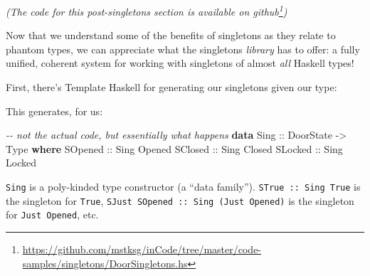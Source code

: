 \documentclass[]{article}
\newenvironment{Shaded}{}{}
\newcommand{\CommentTok}[1]{\textcolor[rgb]{0.38,0.63,0.69}{\textit{#1}}}
\newcommand{\DataTypeTok}[1]{\textcolor[rgb]{0.56,0.13,0.00}{#1}}
\newcommand{\KeywordTok}[1]{\textcolor[rgb]{0.00,0.44,0.13}{\textbf{#1}}}
\newcommand{\NormalTok}[1]{#1}
\newcommand{\OperatorTok}[1]{\textcolor[rgb]{0.40,0.40,0.40}{#1}}
\newcommand{\OtherTok}[1]{\textcolor[rgb]{0.00,0.44,0.13}{#1}}
\renewcommand{\href}[2]{#2\footnote{\url{#1}}}
\begin{document}
\emph{(The code for this post-singletons section is available
\href{https://github.com/mstksg/inCode/tree/master/code-samples/singletons/DoorSingletons.hs}{on
github})}

Now that we understand some of the benefits of singletons as they relate to
phantom types, we can appreciate what the singletons \emph{library} has to
offer: a fully unified, coherent system for working with singletons of almost
\emph{all} Haskell types!

First, there's Template Haskell for generating our singletons given our type:

\begin{Shaded}
\end{Shaded}

This generates, for us:

\begin{Shaded}
\begin{Highlighting}[]
\CommentTok{{-}{-} not the actual code, but essentially what happens}
\KeywordTok{data} \DataTypeTok{Sing}\OtherTok{ ::} \DataTypeTok{DoorState} \OtherTok{{-}>} \DataTypeTok{Type} \KeywordTok{where}
    \DataTypeTok{SOpened}\OtherTok{ ::} \DataTypeTok{Sing} \DataTypeTok{\textquotesingle{}Opened}
    \DataTypeTok{SClosed}\OtherTok{ ::} \DataTypeTok{Sing} \DataTypeTok{\textquotesingle{}Closed}
    \DataTypeTok{SLocked}\OtherTok{ ::} \DataTypeTok{Sing} \DataTypeTok{\textquotesingle{}Locked}
\end{Highlighting}
\end{Shaded}

\texttt{Sing} is a poly-kinded type constructor (a ``data family'').
\texttt{STrue\ ::\ Sing\ \textquotesingle{}True} is the singleton for
\texttt{\textquotesingle{}True},
\texttt{SJust\ SOpened\ ::\ Sing\ (\textquotesingle{}Just\ \textquotesingle{}Opened)}
is the singleton for \texttt{\textquotesingle{}Just\ \textquotesingle{}Opened},
etc.
\end{document}
